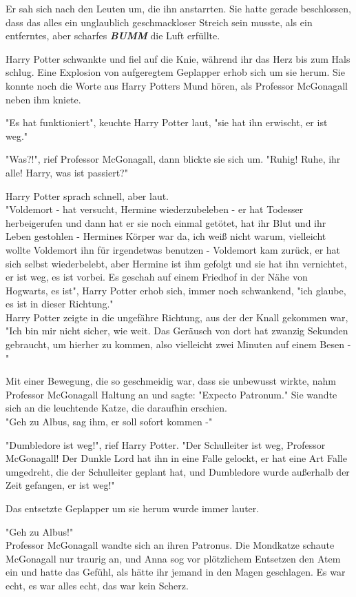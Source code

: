 {Er sah sich nach den Leuten um, die ihn anstarrten. Sie hatte gerade beschlossen, dass das alles ein unglaublich geschmackloser Streich sein musste, als ein entferntes, aber scharfes \textbf{\emph{BUMM}} die Luft erfüllte.

Harry Potter schwankte und fiel auf die Knie, während ihr das Herz bis zum Hals schlug. Eine Explosion von aufgeregtem Geplapper erhob sich um sie herum. Sie konnte noch die Worte aus Harry Potters Mund hören, als Professor McGonagall neben ihm kniete.

"Es hat funktioniert", keuchte Harry Potter laut, "sie hat ihn erwischt, er ist weg."

"Was?!", rief Professor McGonagall, dann blickte sie sich um. "Ruhig! Ruhe, ihr alle! Harry, was ist passiert?"

Harry Potter sprach schnell, aber laut.\\ "Voldemort - hat versucht, Hermine wiederzubeleben - er hat Todesser herbeigerufen und dann hat er sie noch einmal getötet, hat ihr Blut und ihr Leben gestohlen - Hermines Körper war da, ich weiß nicht warum, vielleicht wollte Voldemort ihn für irgendetwas benutzen - Voldemort kam zurück, er hat sich selbst wiederbelebt, aber Hermine ist ihm gefolgt und sie hat ihn vernichtet, er ist weg, es ist vorbei. Es geschah auf einem Friedhof in der Nähe von Hogwarts, es ist", Harry Potter erhob sich, immer noch schwankend, "ich glaube, es ist in dieser Richtung."\\ Harry Potter zeigte in die ungefähre Richtung, aus der der Knall gekommen war,\\ "Ich bin mir nicht sicher, wie weit. Das Geräusch von dort hat zwanzig Sekunden gebraucht, um hierher zu kommen, also vielleicht zwei Minuten auf einem Besen -"

Mit einer Bewegung, die so geschmeidig war, dass sie unbewusst wirkte, nahm Professor McGonagall Haltung an und sagte: "Expecto Patronum." Sie wandte sich an die leuchtende Katze, die daraufhin erschien.\\ "Geh zu Albus, sag ihm, er soll sofort kommen -"

"Dumbledore ist weg!", rief Harry Potter. "Der Schulleiter ist weg, Professor McGonagall! Der Dunkle Lord hat ihn in eine Falle gelockt, er hat eine Art Falle umgedreht, die der Schulleiter geplant hat, und Dumbledore wurde außerhalb der Zeit gefangen, er ist weg!"

Das entsetzte Geplapper um sie herum wurde immer lauter.

"Geh zu Albus!"\\ Professor McGonagall wandte sich an ihren Patronus. Die Mondkatze schaute McGonagall nur traurig an, und Anna sog vor plötzlichem Entsetzen den Atem ein und hatte das Gefühl, als hätte ihr jemand in den Magen geschlagen. Es war echt, es war alles echt, das war kein Scherz.

}
